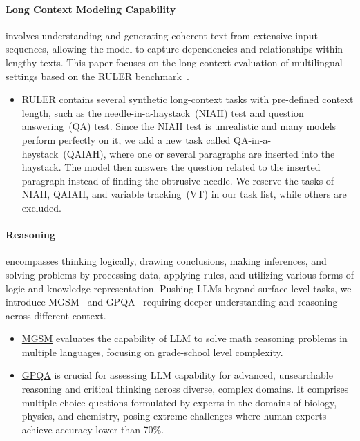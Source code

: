 \paragraph{Long Context Modeling Capability} involves understanding and generating coherent text from extensive input sequences, allowing the model to capture dependencies and relationships within lengthy texts. This paper focuses on the long-context evaluation of multilingual settings based on the RULER benchmark~\cite{hsieh2024ruler}.
\begin{itemize}[nosep,itemsep=1pt,leftmargin=0.1cm]
    \item \underline{RULER} contains several synthetic long-context tasks with pre-defined context length,  such as the needle-in-a-haystack~(NIAH) test and question answering~(QA) test.
Since the NIAH test is unrealistic and many models perform perfectly on it, we add a new task called QA-in-a-heystack~(QAIAH), where one or several paragraphs are inserted into the haystack. The model then answers the question related to the inserted paragraph instead of finding the obtrusive needle. We reserve the tasks of NIAH, QAIAH, and variable tracking~(VT) in our task list, while others are excluded. 
\end{itemize}


\paragraph{Reasoning} encompasses thinking logically, drawing conclusions, making inferences, and solving problems by processing data, applying rules, and utilizing various forms of logic and knowledge representation. Pushing LLMs beyond surface-level tasks, we introduce MGSM~\cite{shi2023language} and GPQA~\cite{Rein2023GPQAAG} requiring deeper understanding and reasoning across different context.
\begin{itemize}[nosep,itemsep=1pt,leftmargin=0.1cm]
    \item \underline{MGSM} evaluates the capability of LLM to solve math reasoning problems in multiple languages, focusing on grade-school level complexity.
    \item \underline{GPQA} is crucial for assessing LLM capability for advanced, unsearchable reasoning and critical thinking across diverse, complex domains. It comprises multiple choice questions formulated by experts in the domains of biology, physics, and chemistry, posing extreme challenges where human experts achieve accuracy lower than 70\%.
\end{itemize}

